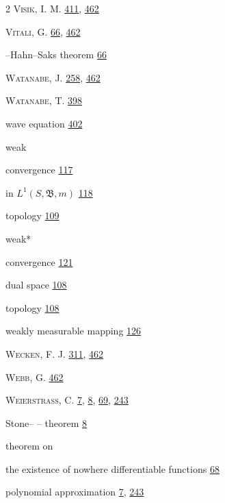 \begin{multicols}{2}
\noindent \textsc{Visik}, I. M. \hyperlink{page.411}{411}, \hyperlink{page.462}{462}\par
\noindent \textsc{Vitali}, G. \hyperlink{page.66}{66}, \hyperlink{page.462}{462}\par
\hspace*{1.1em}--Hahn--Saks theorem \hyperlink{page.66}{66}\par
\noindent \textsc{Watanabe}, J. \hyperlink{page.258}{258}, \hyperlink{page.462}{462}\par
\noindent \textsc{Watanabe}, T. \hyperlink{page.398}{398}\par
\noindent wave equation \hyperlink{page.402}{402}\par
\noindent weak\par
\hspace*{1.1em}convergence \hyperlink{page.117}{117}\par
\noindent in $L^{1}(S, \mathfrak{B}, m)$ \hyperlink{page.118}{118}\par
\hspace*{1.1em}topology \hyperlink{page.109}{109}\par
\noindent weak*\par
\hspace*{1.1em}convergence \hyperlink{page.121}{121}\par
\hspace*{1.1em}dual space \hyperlink{page.108}{108}\par
\hspace*{1.1em}topology \hyperlink{page.108}{108}\par
\noindent weakly measurable mapping \hyperlink{page.126}{126}\par
\noindent \textsc{Wecken}, F. J. \hyperlink{page.311}{311}, \hyperlink{page.462}{462}\par
\noindent \textsc{Webb}, G. \hyperlink{page.462}{462}\par
\noindent \textsc{Weierstrass}, C. \hyperlink{page.7}{7}, \hyperlink{page.8}{8}, \hyperlink{page.69}{69}, \hyperlink{page.243}{243}\par
\hspace*{1.1em}Stone-- -- theorem \hyperlink{page.8}{8}\par
\hspace*{1.1em}theorem on\par
\hspace*{2.2em}the existence of nowhere differentiable functions \hyperlink{page.68}{68}\par
\hspace*{2.2em}polynomial approximation \hyperlink{page.7}{7}, \hyperlink{page.243}{243}\par

\end{multicols}
